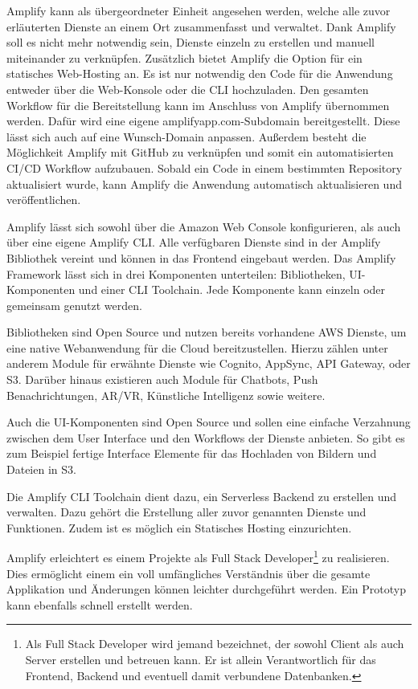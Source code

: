 {Amplify kann als übergeordneter Einheit angesehen werden, welche alle zuvor erläuterten Dienste an einem Ort zusammenfasst und verwaltet.
Dank Amplify soll es nicht mehr notwendig sein, Dienste einzeln zu erstellen und manuell miteinander zu verknüpfen.
Zusätzlich bietet Amplify die Option für ein statisches Web-Hosting an.
Es ist nur notwendig den Code für die Anwendung entweder über die Web-Konsole oder die CLI hochzuladen.
Den gesamten Workflow für die Bereitstellung kann im Anschluss von Amplify übernommen werden.
Dafür wird eine eigene amplifyapp.com-Subdomain bereitgestellt.
Diese lässt sich auch auf eine Wunsch-Domain anpassen.
Außerdem besteht die Möglichkeit Amplify mit GitHub zu verknüpfen und somit ein automatisierten CI/CD Workflow aufzubauen.
Sobald ein Code in einem bestimmten Repository aktualisiert wurde, kann Amplify die Anwendung automatisch aktualisieren und veröffentlichen.
 \cite[]{AmplifyHosting}

Amplify lässt sich sowohl über die Amazon Web Console konfigurieren, als auch über eine eigene Amplify CLI.
Alle verfügbaren Dienste sind in der Amplify Bibliothek vereint und können in das Frontend eingebaut werden.
Das Amplify Framework lässt sich in drei Komponenten unterteilen: Bibliotheken, UI-Komponenten und einer CLI Toolchain.
Jede Komponente kann einzeln oder gemeinsam genutzt werden.

Bibliotheken sind Open Source und nutzen bereits vorhandene AWS Dienste, um eine native Webanwendung für die Cloud bereitzustellen.
Hierzu zählen unter anderem Module für erwähnte Dienste wie Cognito, AppSync, API Gateway, oder S3.
Darüber hinaus existieren auch Module für Chatbots, Push Benachrichtungen, AR/VR, Künstliche Intelligenz sowie weitere.

Auch die UI-Komponenten sind Open Source und sollen eine einfache Verzahnung zwischen dem User Interface und den Workflows der Dienste anbieten.
So gibt es zum Beispiel fertige Interface Elemente für das Hochladen von Bildern und Dateien in S3.

Die Amplify CLI Toolchain dient dazu, ein Serverless Backend zu erstellen und verwalten.
Dazu gehört die Erstellung aller zuvor genannten Dienste und Funktionen.
Zudem ist es möglich ein Statisches Hosting einzurichten.

Amplify erleichtert es einem Projekte als Full Stack Developer\footnote{Als Full Stack Developer wird jemand bezeichnet, der sowohl Client als auch Server
erstellen und betreuen kann. Er ist allein Verantwortlich für das Frontend, Backend und eventuell damit verbundene Datenbanken.} zu realisieren.
Dies ermöglicht einem ein voll umfängliches Verständnis über die gesamte Applikation und Änderungen können leichter durchgeführt werden.
Ein Prototyp kann ebenfalls schnell erstellt werden.
 \cite[]{AWSAmplifyKomponenten}


}
